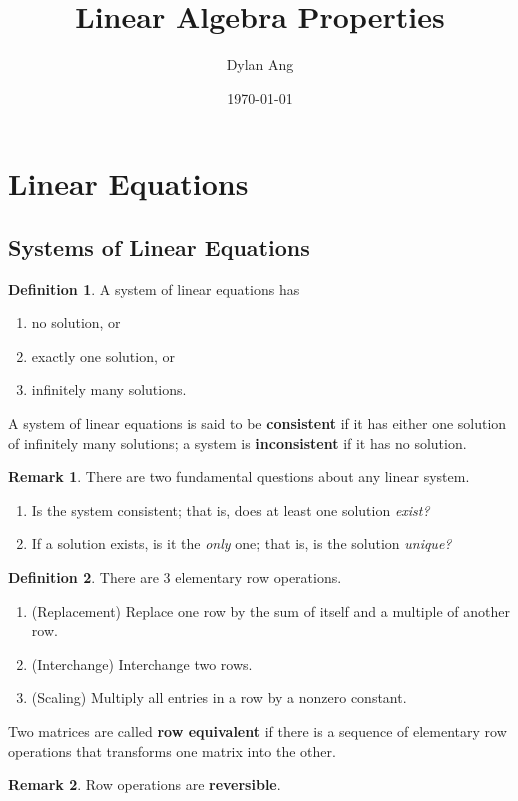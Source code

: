\documentclass[12pt]{article}
\title{Linear Algebra Properties}
\author{Dylan Ang}
\date{\today}
\theoremstyle{definition}
\newtheorem{definition}{Definition} %
\newtheorem*{remark}{Remark}        %
\numberwithin{equation}{theorem}    %
\begin{document}
\maketitle

\tableofcontents

\section{Linear Equations}

\subsection{Systems of Linear Equations}

\begin{definition}
    A system of linear equations has
    \begin{enumerate}
        \item no solution, or
        \item exactly one solution, or
        \item infinitely many solutions.
    \end{enumerate}
    A system of linear equations is said to be \textbf{consistent} if it has either one solution of infinitely many solutions; a system is \textbf{inconsistent} if it has no solution.
    \begin{remark}
        There are two fundamental questions about any linear system.
        \begin{enumerate}
            \item Is the system consistent; that is, does at least one solution \emph{exist?}
            \item If a solution exists, is it the \emph{only} one; that is, is the solution \emph{unique?}
        \end{enumerate}
    \end{remark}
\end{definition}

\begin{definition}
    There are 3 elementary row operations.
    \begin{enumerate}
        \item (Replacement) Replace one row by the sum of itself and a multiple of another row.
        \item (Interchange) Interchange two rows.
        \item (Scaling) Multiply all entries in a row by a nonzero constant.
    \end{enumerate}
    Two matrices are called \textbf{row equivalent} if there is a sequence of elementary row operations that transforms one matrix into the other.
    \begin{remark}
        Row operations are \textbf{reversible}.
    \end{remark}
\end{definition}
\end{document}
